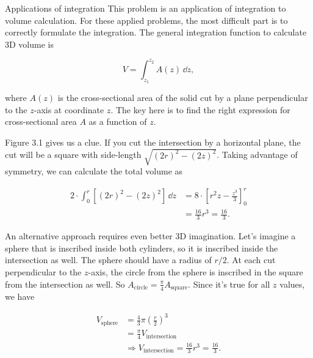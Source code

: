 \begin{solution}
\begin{concept}{Applications of integration}
This problem is an application of integration to volume calculation. For these applied
problems, the most difficult part is to correctly formulate the integration. The general
integration function to calculate 3D volume is

\[
  V=\int_{z_1}^{z_2}A(z)\,\dd z,
\]
\end{concept}

where $A(z)$ is the cross-sectional area of the solid cut by a plane perpendicular to the
$z$-axis at coordinate $z$. The key here is to find the right expression for cross-sectional
area $A$ as a function of $z$.

Figure 3.1 gives us a clue. If you cut the intersection by a horizontal plane, the cut will
be a square with side-length $\sqrt{(2r)^2-(2z)^2}$. Taking advantage of symmetry, we can
calculate the total volume as

\[
  \begin{aligned}
  2\cdot\int_{0}^{r}\left[(2r)^2-(2z)^2\right] \,\dd z
  &=8\cdot\left[r^2z-\frac{z^3}{3}\right]_{0}^{r}\\
  &=\frac{16}{3}r^3=\frac{16}{3}.
  \end{aligned}
\]

An alternative approach requires even better 3D imagination. Let's imagine a sphere that is
inscribed inside both cylinders, so it is inscribed inside the intersection as well. The sphere
should have a radius of $r/2$. At each cut perpendicular to the $z$-axis, the circle from the
sphere is inscribed in the square from the intersection as well. So
$A_{\mathrm{circle}}=\frac{\pi}{4}A_{\mathrm{square}}$. Since it's true for all $z$ values, we have

\[
  \begin{aligned}
  V_{\mathrm{sphere}}&=\frac{4}{3}\pi\left(\frac{r}{2}\right)^3\\
  &=\frac{\pi}{4}V_{\mathrm{intersection}}\\
  &\Rightarrow V_{\mathrm{intersection}}=\frac{16}{3}r^3=\frac{16}{3}.
  \end{aligned}
\]


\end{solution}
